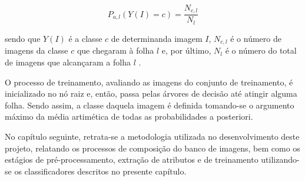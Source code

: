 \begin{equation}
\label{eq:probabilidade}
 P_{a,l}(Y(I)=c) = \frac{N_{c,l}}{N_l}
\end{equation}

 sendo que $Y(I)$ é a classe $c$ de determinanda imagem $I$, $N_{c,l}$ é o número de imagens da classe $c$ que chegaram à folha $l$ e, por último, $N_l$ é o número do total de imagens que alcançaram a folha $l$ .

O processo de treinamento, avaliando as imagens do conjunto de treinamento, é inicializado no nó raiz e, então, passa pelas árvores de decisão até atingir alguma folha. Sendo assim, a classe daquela imagem é definida tomando-se o argumento máximo da média artimética de todas as probabilidades a posteriori.

No capítulo seguinte, retrata-se a metodologia utilizada no desenvolvimento deste projeto, relatando os processos de composição do banco de imagens, bem como os estágios de pré-processamento, extração de atributos e de treinamento utilizando-se os classificadores descritos no presente capítulo.










